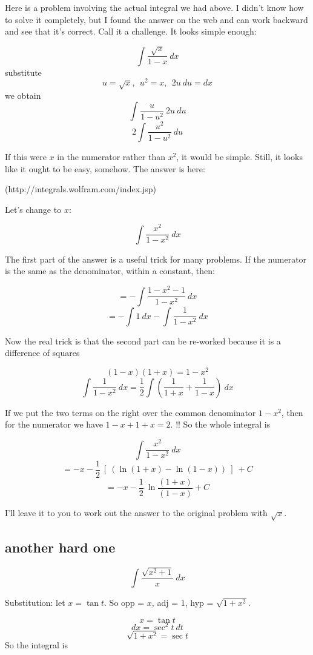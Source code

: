 \documentclass[11pt, oneside]{article}
\begin{document}
Here is a problem involving the actual integral we had above. I didn't know how to solve it completely, but I found the answer on the web and can work backward and see that it's correct.  Call it a challenge.  It looks simple enough:

\[ \int \frac{\sqrt{x}}{1-x} \ dx \]
substitute
\[ u = \sqrt{x}, \ \ u^2 = x, \ \ 2 u \ du = dx \]
we obtain
\[ \int \frac{u}{1-u^2} \ 2 u \ du \]
\[ 2 \int \frac{u^2}{1-u^2} \ du \]

If this were $x$ in the numerator rather than $x^2$, it would be simple.  Still, it looks like it ought to be easy, somehow.  The answer is here:

(http://integrals.wolfram.com/index.jsp)

Let's change to $x$:

\[ \int \frac{x^2}{1-x^2} \ dx \]

The first part of the answer is a useful trick for many problems.  If the numerator is the same as the denominator, within a constant, then:

\[ = - \int \frac{1-x^2 - 1}{1-x^2} \ dx \]
\[ = -\int 1 \ dx - \int \frac{1}{1-x^2} \ dx \]

Now the real trick is that the second part can be re-worked because it is a difference of squares 

\[ (1-x)(1+x) = 1-x^2 \]
\[ \int \frac{1}{1-x^2} \ dx = \frac{1}{2} \int ( \frac{1}{1+x} + \frac{1}{1-x} ) \ dx \]

If we put the two terms on the right over the common denominator $1-x^2$, then for the numerator we have $1-x + 1 + x = 2$.  !!  So the whole integral is

\[ \int \frac{x^2}{1-x^2} \ dx \]
\[ = -x - \frac{1}{2} \ [ \ (\ln (1+x) - \ln(1-x) ) \ ] \ + C \]
\[ = -x - \frac{1}{2} \ \ln \frac{(1+x)}{(1-x)} + C \]

I'll leave it to you to work out the answer to the original problem with $\sqrt{x}$.

\subsection*{another hard one}

\[ \int \frac{\sqrt{x^2 + 1}}{x} \ dx \]

Substitution:  let $x=\tan t$.  So opp = $x$, adj = $1$, hyp = $\sqrt{1 + x^2}$.

\[ x = \tan t \]
\[ dx = \sec^2 t \ dt \]
\[ \sqrt{1 + x^2} = \sec t \]
So the integral is
\end{document}
